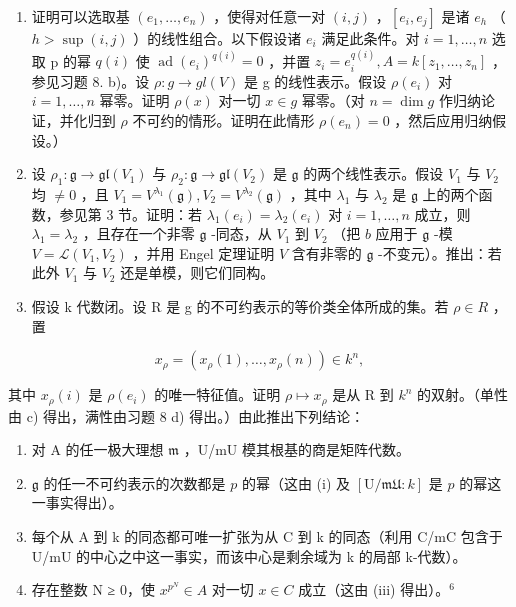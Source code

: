 \begin{enumerate}
\def\labelenumi{\alph{enumi})}
\item
  证明可以选取基 \((e_{1},\ldots,e_{n})\) ，使得对任意一对 \((i,j)\) ，\([e_{i},e_{j}]\) 是诸 \(e_{h}\) （ \(h > \sup(i,j)\) ）的线性组合。以下假设诸 \(e_{i}\) 满足此条件。对 \(i=1,\ldots,n\) 选取 p 的幂 \(q(i)\) 使 \(\operatorname{ad}(e_{i})^{q(i)} = 0\) ，并置 \(z_{i} = e_{i}^{q(i)}, A = k[z_{1},\ldots,z_{n}]\) ，参见习题 8. b)。设 \(\rho : g \to gl(V)\) 是 g 的线性表示。假设 \(\rho(e_{i})\) 对 \(i = 1,\ldots,n\) 幂零。证明 \(\rho(x)\) 对一切 \(x \in g\) 幂零。（对 \(n = \dim g\) 作归纳论证，并化归到 \(\rho\) 不可约的情形。证明在此情形 \(\rho(e_{n}) = 0\) ，然后应用归纳假设。）
\item
  设 \(\rho_1: \mathfrak{g} \to \mathfrak{gl}(V_1)\) 与 \(\rho_2: \mathfrak{g} \to \mathfrak{gl}(V_2)\) 是 \(\mathfrak{g}\) 的两个线性表示。假设 \(V_1\) 与 \(V_2\) 均 \(\neq 0\) ，且 \(V_1 = V^{\lambda_1}(\mathfrak{g}), V_2 = V^{\lambda_2}(\mathfrak{g})\) ，其中 \(\lambda_1\) 与 \(\lambda_2\) 是 \(\mathfrak{g}\) 上的两个函数，参见第 3 节。证明：若 \(\lambda_1(e_i) = \lambda_2(e_i)\) 对 \(i = 1, \ldots, n\) 成立，则 \(\lambda_1 = \lambda_2\) ，且存在一个非零 \(\mathfrak{g}\) -同态，从 \(V_1\) 到 \(V_2\) （把 \(b\) 应用于 \(\mathfrak{g}\) -模 \(V = \mathcal{L}(V_1, V_2)\) ，并用 Engel 定理证明 \(V\) 含有非零的 \(\mathfrak{g}\) -不变元）。推出：若此外 \(V_1\) 与 \(V_2\) 还是单模，则它们同构。
\item
  假设 k 代数闭。设 R 是 g 的不可约表示的等价类全体所成的集。若 \(\rho \in R\) ，置
\end{enumerate}

\[
x _ {\rho} = (x _ {\rho} (1), \dots , x _ {\rho} (n)) \in k ^ {n},
\]

其中 \(x_{\rho}(i)\) 是 \(\rho(e_{i})\) 的唯一特征值。证明 \(\rho \mapsto x_{\rho}\) 是从 R 到 \(k^{n}\) 的双射。（单性由 c) 得出，满性由习题 8 d) 得出。）由此推出下列结论：

\begin{enumerate}
\def\labelenumi{(\roman{enumi})}
\item
  对 A 的任一极大理想 \(\mathfrak{m}\) ，U/mU 模其根基的商是矩阵代数。
\item
  \(\mathfrak{g}\) 的任一不可约表示的次数都是 \(p\) 的幂（这由 (i) 及 \([\mathrm{U} / \mathfrak{mU}:k]\) 是 \(p\) 的幂这一事实得出）。
\item
  每个从 A 到 k 的同态都可唯一扩张为从 C 到 k 的同态（利用 C/mC 包含于 U/mU 的中心之中这一事实，而该中心是剩余域为 k 的局部 k-代数）。
\item
  存在整数 N ≥ 0，使 \(x^{p^{N}} \in A\) 对一切 \(x \in C\) 成立（这由 (iii) 得出）。\(^{6}\)
\end{enumerate}

